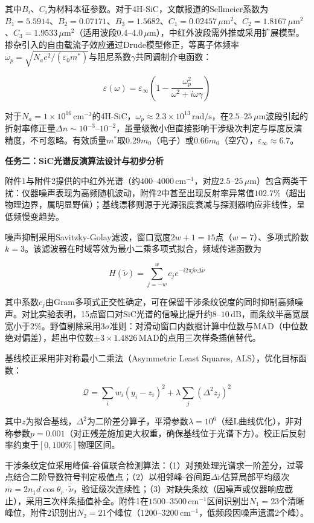 \documentclass{mcmthesis}
\begin{document}
其中$B_i$、$C_i$为材料本征参数。对于4H-SiC，文献报道的Sellmeier系数为$B_1=5.5914$、$B_2=0.07171$、$B_3=1.5682$、$C_1=0.02457\,\mu\mathrm{m}^2$、$C_2=1.8167\,\mu\mathrm{m}^2$、$C_3=1.9533\,\mu\mathrm{m}^2$（适用波段$0.4$–$4.0\,\mu\mathrm{m}$），中红外波段需外推或采用扩展模型。掺杂引入的自由载流子效应通过Drude模型修正，等离子体频率$\omega_p=\sqrt{N_ae^2/(\varepsilon_0m^*)}$与阻尼系数$\gamma$共同调制介电函数：

$$\varepsilon(\omega)=\varepsilon_{\infty}\left(1-\frac{\omega_p^2}{\omega^2+i\omega\gamma}\right) \tag{7}$$

对于$N_a=1\times10^{16}\,\mathrm{cm}^{-3}$的4H-SiC，$\omega_p\approx2.3\times10^{13}\,\mathrm{rad/s}$，在$2.5$–$25\,\mu\mathrm{m}$波段引起的折射率修正量$\Delta n\sim10^{-3}$–$10^{-2}$，虽量级微小但直接影响干涉级次判定与厚度反演精度，不可忽略。有效质量$m^*$取$0.29m_0$（电子）或$0.66m_0$（空穴），$\varepsilon_{\infty}\approx 6.7$。

\textbf{任务二：SiC光谱反演算法设计与初步分析}

附件1与附件2提供的中红外光谱（约$400$–$4000\,\mathrm{cm}^{-1}$，对应$2.5$–$25\,\mu\mathrm{m}$）包含两类干扰：仪器噪声表现为高频随机波动，附件2中甚至出现反射率异常值$102.7\%$（超出物理边界，属明显野值）；基线漂移则源于光源强度衰减与探测器响应非线性，呈低频慢变趋势。

噪声抑制采用Savitzky-Golay滤波，窗口宽度$2w+1=15$点（$w=7$）、多项式阶数$k=3$。该滤波器在时域等效为最小二乘多项式拟合，频域传递函数为

$$H(\tilde{\nu})=\sum_{j=-w}^{w}c_je^{-i2\pi j\tilde{\nu}\Delta\tilde{\nu}} \tag{8}$$

其中系数$c_j$由Gram多项式正交性确定，可在保留干涉条纹锐度的同时抑制高频噪声。对比实验表明，15点窗口对SiC光谱的信噪比提升约$8$–$10\,\mathrm{dB}$，而条纹半高宽展宽小于$2\%$。野值剔除采用$3\sigma$准则：对滑动窗口内数据计算中位数与MAD（中位数绝对偏差），超出中位数$\pm 3\times 1.4826\,\mathrm{MAD}$的点用三次样条插值替代。

基线校正采用非对称最小二乘法（Asymmetric Least Squares, ALS），优化目标函数：

$$\mathcal{Q} = \sum_{i}w_i(y_i-z_i)^2 + \lambda\sum_{j}(\Delta^2 z_j)^2 \tag{9}$$

其中$z$为拟合基线，$\Delta^2$为二阶差分算子，平滑参数$\lambda=10^6$（经L曲线优化），非对称参数$p=0.001$（对正残差施加更大权重，确保基线位于光谱下方）。校正后反射率约束于$[0,100\%]$物理区间。

干涉条纹定位采用峰值-谷值联合检测算法：（1）对预处理光谱求一阶差分，过零点结合二阶导数符号判定极值点；（2）以相邻峰-谷间距$\Delta\tilde{\nu}$估算局部平均级次$\bar{m}=2n_1d\cos\theta_r\cdot\bar{\tilde{\nu}}$，验证级次连续性；（3）对缺失条纹（因噪声或仪器响应截止），采用三次样条插值补全。附件1在$1500$–$3500\,\mathrm{cm}^{-1}$区间识别出$N_1=23$个清晰峰位，附件2识别出$N_2=21$个峰位（$1200$–$3200\,\mathrm{cm}^{-1}$，低频段因噪声遗漏2个峰）。
\end{document}
